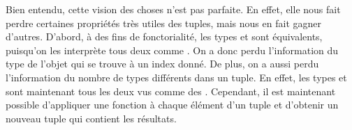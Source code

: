 
Bien entendu, cette vision des choses n'est pas parfaite. En effet, elle
nous fait perdre certaines propriétés très utiles des tuples, mais nous en
fait gagner d'autres. D'abord, à des fins de fonctorialité, les types
 et  sont
équivalents, puisqu'on les interprète tous deux comme
. On a donc perdu l'information du
type de l'objet qui se trouve à un index donné. De plus, on a aussi perdu
l'information du nombre de types différents dans un tuple. En effet, les
types  et  sont maintenant tous les
deux vus comme des . Cependant, il est
maintenant possible d'appliquer une fonction à chaque élément d'un
tuple et d'obtenir un nouveau tuple qui contient les résultats.




\begin{comment}
Ensuite, supposons qu'on veut ordonner deux tuples. Quand est-ce que ça
fait du sens de faire ça? Pour répondre à cette question, on commence
par voir le tuple comme un array de variants. Ensuite, il suffit de faire
une comparaison lexicographique standard sur cet array. Le problème devient
donc de savoir comment on peut comparer deux variants. La nouvelle question
se formule ainsi: Étant donné deux variants<T1, ..., Tn>, quand est-ce
qu'il fait du sens d'ordonner ces variants. Pour nous faciliter la vie,
on commence par réduire le problème en ne considérant que des variants
binaires, c'est-à-dire des variants de la forme variant<T, U>. On ne perd
aucune généralité parce qu'un variant n-aire variant<T1, ..., Tn> est
équivalent à un variant binaire variant<T1, variant<T2, ..., Tn>>.
La question est maintenant beaucoup plus simple: étant donné deux
variants variant<T, U>, quand est-ce qu'il fait du sens de les comparer?
Il se trouve que j'ai déjà la réponse dans Hana avec les cross-type
operations!
    >> Ok, pas certain qu'on veuille orderer les tuples comme des arrays de
    >> variants. C'est peut-être mieux de juste les regarder comme des tuples
    >> normaux.


Ensuite, on peut faire le pont avec Hana en disant simplement que Hana
considère qu'une fonction sur un variant connu au moment de la compilation
n'est rien d'autre qu'une fonction overloadée, et que hana::_tuple est un
array de variants qui est super optimisé pour les cas où on connaît
ce qui est contenu dans chaque variant de l'array au moment de la
compilation.
\end{comment}



